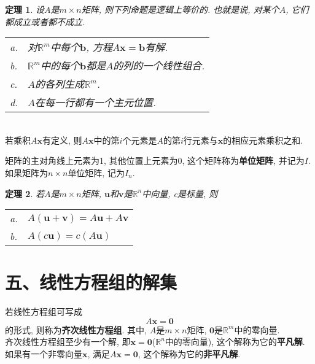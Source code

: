 \documentclass[UTF8,fontset=ubuntu]{ctexart}
\theoremstyle{plain}
\newtheorem{theorem}{定理}
\theoremstyle{nonumberplain}
\theoremstyle{empty}
\begin{document}
\begin{theorem}
设$A$是$m\times n$矩阵, 则下列命题是逻辑上等价的. 也就是说, 对某个$A$, 它们都成立或者都不成立.\\
\begin{tabular}{l@{\,}l}
a. & 对$\mathbb{R}^m$中每个$\bm{b}$, 方程$A\bm{x}=\bm{b}$有解.\\
b. & $\mathbb{R}^m$中的每个$\bm{b}$都是$A$的列的一个线性组合.\\
c. & $A$的各列生成$\mathbb{R}^m$.\\
d. & $A$在每一行都有一个主元位置.\\[2ex]
\end{tabular}
\end{theorem}\vspace{2ex}

\begin{law}[计算$A\bm{x}$的行--向量规则]\ \\
若乘积$A\bm{x}$有定义, 则$A\bm{x}$中的第$i$个元素是$A$的第$i$行元素与$\bm{x}$的相应元素乘积之和.
\end{law}\vspace{2ex}

矩阵的主对角线上元素为1, 其他位置上元素为0, 这个矩阵称为\textbf{单位矩阵}, 并记为$I$.\\
如果矩阵为$n\times n$单位矩阵, 记为$I_n$.\\[2ex]

\begin{theorem}
若$A$是$m\times n$矩阵, $\bm{u}$和$\bm{v}$是$\mathbb{R}^n$中向量, c是标量, 则\\
\begin{tabular}{l@{\,}l}
a. & $A(\bm{u}+\bm{v})=A\bm{u}+A\bm{v}$\\
b. & $A(c\bm{u})=c(A\bm{u})$
\end{tabular}
\end{theorem}\vspace{6ex}

\section{五、线性方程组的解集}
若线性方程组可写成
\[A\bm{x}=\bm{0}\]
的形式, 则称为\textbf{齐次线性方程组}. 其中, $A$是$m\times n$矩阵, $\bm{0}$是$\mathbb{R}^m$中的零向量.\\
齐次线性方程组至少有一个解, 即$\bm{x}=\bm{0}$($\mathbb{R}^n$中的零向量), 这个解称为它的\textbf{平凡解}.\\
如果有一个非零向量$\bm{x}$, 满足$A\bm{x}=\bm{0}$, 这个解称为它的\textbf{非平凡解}.\\[2ex]
\end{document}
